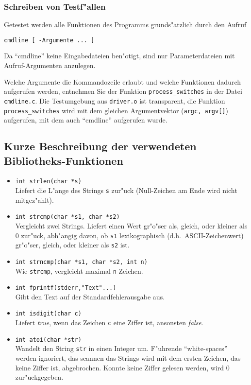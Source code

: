 \subsubsection*{Schreiben von Testf"allen}

Getestet werden alle Funktionen des Programms grunds"atzlich durch den
Aufruf 
\begin{verbatim}
cmdline [ -Argumente ... ] 
\end{verbatim}
Da "`cmdline"' keine Eingabedateien ben"otigt, sind nur Parameterdateien
mit Aufruf-Argumenten anzulegen.

Welche Argumente die Kommandozeile erlaubt und welche 
Funktionen dadurch aufgerufen werden, entnehmen Sie der Funktion 
{\tt process\_switches} in der Datei {\tt cmdline.c}.
Die Testumgebung aus {\tt driver.o} ist transparent, 
die Funktion {\tt process\_switches} wird mit dem gleichen Argumentvektor 
({\tt argc, argv[]}) aufgerufen, mit dem auch "`cmdline"' aufgerufen wurde. 


\subsection*{Kurze Beschreibung der verwendeten Bibliotheks-Funktionen}

\begin{itemize}
   \item {\tt int strlen(char *s)}\\
      Liefert die L"ange des Strings {\tt s}
      zur"uck (Null-Zeichen am Ende wird nicht mitgez"ahlt).
   \item {\tt int strcmp(char *s1, char *s2)}\\
      Vergleicht zwei Strings. Liefert einen Wert gr"o"ser als, gleich, oder
      kleiner als 0 zur"uck, abh"angig davon, ob {\tt s1} lexikographisch
      (d.h.~ASCII-Zeichenwert) gr"o"ser, gleich, oder
      kleiner als {\tt s2} ist.
   \item {\tt int strncmp(char *s1, char *s2, int n)}\\
      Wie {\tt strcmp}, vergleicht maximal {\tt n} Zeichen.
   \item {\tt int fprintf(stderr,"Text"...)}\\
      Gibt den Text auf der Standardfehlerausgabe aus.
   \item {\tt int isdigit(char c)}\\
      Liefert {\em true\/}, wenn das Zeichen {\tt c} eine Ziffer ist,
      ansonsten {\em false\/}.
   \item {\tt int atoi(char *str)}\\
      Wandelt den String {\tt str} in einen Integer um. F"uhrende
      "`white-spaces"' werden ignoriert, das scannen das Strings wird mit dem
      ersten Zeichen, das keine Ziffer ist, abgebrochen. Konnte keine Ziffer
      gelesen werden, wird 0 zur"uckgegeben.
\end{itemize}

